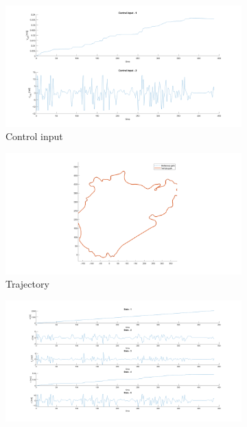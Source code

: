 \begin{figure}[H]
    \centering
     \begin{subfigure}[b]{0.45\textwidth}
         \centering
         \includegraphics[width=\textwidth]{Latex report/image/ex2/input.png}
         \caption{Control input}
         \label{fig:input}
     \end{subfigure}
     \begin{subfigure}[b]{0.45\textwidth}
         \centering
         \includegraphics[width=\textwidth]{Latex report/image/ex2/trajectory.png}
         \caption{Trajectory}
         \label{fig:traj}
     \end{subfigure}
     \begin{subfigure}[b]{0.8\textwidth}
         \centering
         \includegraphics[width=\textwidth]{Latex report/image/ex2/state.png}

\end{subfigure}
\end{figure}
